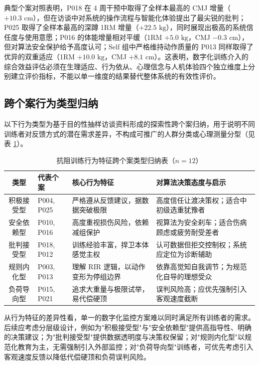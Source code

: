 \documentclass[UTF8,zihao=-4,twoside,openany]{ctexbook}
\begin{document}
典型个案对照表明，P018 在 4 周干预中取得了全样本最高的 CMJ 增量（$+10.3\text{ cm}$），但在访谈中对系统的操作流程与智能化体验提出了最尖锐的批判；P025 取得了全样本最高的深蹲 1RM 增量（$+22.5\text{ kg}$），同时展现出极高的系统信任度与使用意愿；P016 的体能增量相对平缓（1RM $+5.0\text{ kg}$，CMJ $-0.3\text{ cm}$），但对算法安全保护给予高度认可；Self 组中严格维持动作质量的 P013 同样取得了优异的双重适应（1RM $+10.0\text{ kg}$，CMJ $+8.1\text{ cm}$）。这表明，数字化训练介入的综合效益评估必须在生理适应、行为依从、心理信念与人机体验四个独立维度上分别建立评价指标，不能以单一维度的结果替代整体系统的有效性评价。

\subsection{跨个案行为类型归纳}
以下行为类型为基于目的性抽样访谈资料形成的探索性跨个案归纳，用于说明不同训练者对反馈方式的潜在需求差异，不构成可推广的人群分类或心理测量分型（见表 \ref{tab:ch4-behavior-types}）。

\begin{table}[htbp]
  \centering
  \caption{抗阻训练行为特征跨个案类型归纳表（$n=12$）}
  \label{tab:ch4-behavior-types}
  \vspace{6pt}
  \small
  \begin{tabularx}{\textwidth}{|c|m{2.2cm}|X|X|}
    \hline
    \textbf{类型} & \textbf{代表个案} & \textbf{核心行为特征} & \textbf{对算法决策态度与启示} \\ \hline
    积极接受型 & P004, P025 & 严格遵从反馈建议，据数据突破极限 & 高度信任让渡决策权；适合中初级选重犹豫者 \\ \hline
    安全依赖型 & P010, P016 & 高度重视损伤风险，依赖减组保护 & 视算法为安全刹车；适合伤病顾虑或疲劳耐受差者 \\ \hline
    批判接受型 & P018, P012 & 训练经验丰富，捍卫本体感觉主权 & 认可数据但拒交控制权；系统应定位为诊断辅助 \\ \hline
    规则内化型 & P003, P013 & 理解 RIR 逻辑，以动作变形为停组边界 & 依靠高觉知自我调节；为规范化自导的理想受众 \\ \hline
    负荷导向型 & P015, P021 & 追求大重量与极限试举，易代偿硬顶 & 误判风险高；应优先强制引入客观速度截断 \\ \hline
  \end{tabularx}
\end{table}

从行为特征的差异性看，单一的数字化监控方案难以同时满足所有训练者的需求。后续应考虑分层级设计，例如为"积极接受型"与"安全依赖型"提供高指导性、明确的决策建议；为"批判接受型"提供数据透明度与决策权保留；对"规则内化型"以规范化教育为主，无需强制引入外部监控；对"负荷导向型"训练者，可优先考虑引入客观速度反馈以降低代偿硬顶和负荷误判风险。
\end{document}
